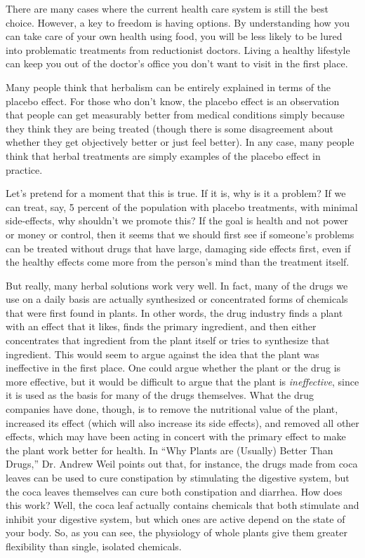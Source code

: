 There are many cases where the current health care system is still the
best choice. However, a key to freedom is having options. By
understanding how you can take care of your own health using food, you
will be less likely to be lured into problematic treatments from
reductionist doctors. 
Living a healthy
lifestyle can keep you out of the doctor’s office you don’t want to
visit in the first place.

\begin{infonote}
Many people think that herbalism can be entirely explained in terms of
the placebo effect. For those who don't know, the
placebo effect is an observation that people can get measurably better
from medical conditions simply because they think they are being
treated (though there is some disagreement about whether they get
objectively better or just feel better). In any case, many people think
that herbal treatments are simply examples of the placebo effect in
practice. 

Let's pretend for a moment that this is true. If
it is, why is
it a problem?  If we
can treat, say, 5 percent of the population with placebo treatments,
with minimal side-effects, why shouldn't we promote
this?  If the goal is health and not power or money or control, then it
seems that we should first see if someone's problems
can be treated without drugs
that have large,
damaging side effects first, even if the healthy effects come more from
the person's mind than the treatment itself.

But really, many herbal solutions work very well.  In fact, many of the
drugs we use on a daily basis are actually synthesized or concentrated
forms of chemicals that were first found in plants. In other words, the
drug industry finds a plant with an effect that it likes, finds the
primary ingredient, and then either concentrates that ingredient from
the plant itself or tries to synthesize that ingredient.  This would
seem to argue against the idea that the plant was ineffective in the
first place. One could argue whether the plant or the drug is more
effective, but it would be difficult to argue that the plant is
\textit{ineffective}, since it is used as the basis for many of the
drugs themselves.  What the drug companies have done, though, is to
remove the nutritional value of the plant, increased its effect (which
will also increase its side effects), and removed all other effects,
which may have been acting in concert with the primary effect to make
the plant work better for health.  In “Why Plants are (Usually) Better
Than Drugs,” Dr. Andrew Weil points out that, for instance, the drugs
made from coca leaves can be used to cure constipation by stimulating
the digestive system, but the coca leaves themselves can cure both
constipation and diarrhea.  How does this work?  Well, the coca leaf
actually contains chemicals that both stimulate and inhibit your
digestive system, but which ones are active depend on the state of your
body.  So, as you can see, the physiology of whole plants give them
greater flexibility than single, isolated chemicals. 


\end{infonote}
